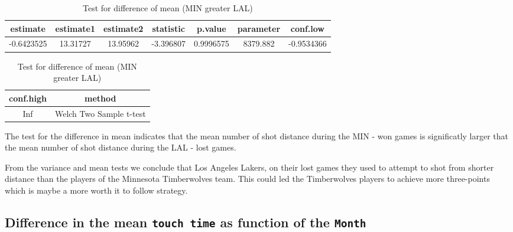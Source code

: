 \documentclass[
  11pt,
]{article}
\begin{document}
\begin{table}[H]
\caption{\label{tab:first-var-test4}Test for difference of mean (MIN greater LAL)}

\centering
\begin{tabular}[t]{ccccccc}
\toprule
estimate & estimate1 & estimate2 & statistic & p.value & parameter & conf.low\\
\midrule
-0.6423525 & 13.31727 & 13.95962 & -3.396807 & 0.9996575 & 8379.882 & -0.9534366\\
\bottomrule
\end{tabular}
\centering
\begin{tabular}[t]{cc}
\toprule
conf.high & method\\
\midrule
Inf & Welch Two Sample t-test\\
\bottomrule
\end{tabular}
\end{table}

The test for the difference in mean indicates that the mean number of shot distance during the MIN - won games is significatly larger that the mean number of shot distance during the LAL - lost games.

From the variance and mean tests we conclude that Los Angeles Lakers, on their lost games they used to attempt to shot from shorter distance than the players of the Minnesota Timberwolves team. This could led the Timberwolves players to achieve more three-points which is maybe a more worth it to follow strategy.

\pagebreak

\hypertarget{difference-in-the-mean-touch-time-as-function-of-the-month}{%
\subsection{\texorpdfstring{Difference in the mean \texttt{touch\ time} as function of the \texttt{Month}}{Difference in the mean touch time as function of the Month}}\label{difference-in-the-mean-touch-time-as-function-of-the-month}}
\end{document}
